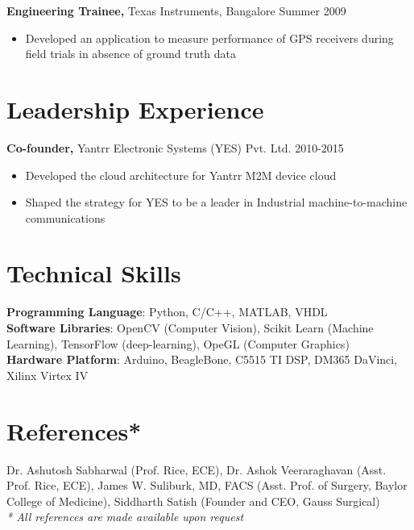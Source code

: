 \documentclass[margin]{res}
\begin{document}
\begin{resume}
\begin{itemize}
\end{itemize}
 
{\bf Engineering Trainee,} Texas Instruments, Bangalore  \hfill
Summer 2009
\begin{itemize} \itemsep -2pt
 \item Developed an application to measure performance of GPS receivers during field trials in absence of ground truth data 


\end{itemize}



\section{Leadership   Experience} 
{\bf Co-founder,} Yantrr Electronic Systems (YES) Pvt. Ltd.     \hfill         2010-2015
\begin{itemize} \itemsep -2pt
\item Developed the cloud architecture for Yantrr M2M device cloud
\item Shaped the strategy for YES to be a leader in Industrial machine-to-machine communications
\end{itemize}

\section{Technical Skills}
{\bf Programming Language}: Python, C/C++, MATLAB, VHDL \\
{\bf Software Libraries}: OpenCV (Computer Vision), Scikit Learn (Machine Learning), TensorFlow (deep-learning), OpeGL (Computer Graphics) \\
{\bf Hardware Platform}: Arduino, BeagleBone, C5515 TI DSP, DM365 DaVinci, Xilinx Virtex IV 
\section{References*} 
Dr. Ashutosh Sabharwal (Prof. Rice, ECE), Dr. Ashok Veeraraghavan (Asst. Prof. Rice, ECE), James W. Suliburk, MD, FACS (Asst. Prof. of Surgery, Baylor College of Medicine), Siddharth Satish (Founder and CEO, Gauss Surgical) \\
\qquad \emph{* All references are made available upon request}

\end{resume} 
\end{document}
